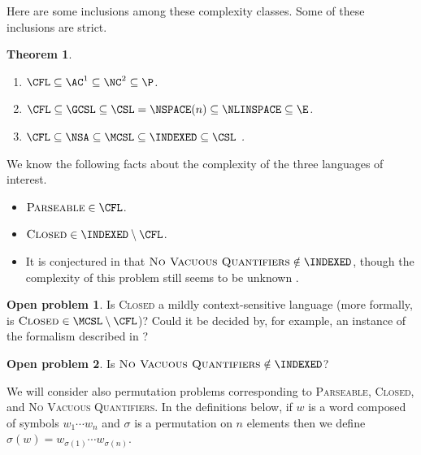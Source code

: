 \documentclass{article}
\newtheorem{theorem}{Theorem}
\theoremstyle{definition}
\newtheorem{openproblem}{Open problem}
\newcommand{\lb}{\left\{} %
\newcommand{\rb}{\right\}} %
\newcommand{\st}{\,\middle|\,} %
\newcommand{\CLOSED}{\textsc{Closed}}
\newcommand{\PARSEABLE}{\textsc{Parseable}}
\newcommand{\NVQ}{\textsc{No Vacuous Quantifiers}}
\begin{document}
Here are some inclusions among these complexity classes.
Some of these inclusions are strict.
\begin{theorem}\mbox{}
  \begin{enumerate}
  \item $\CFL\subseteq\AC^1\subseteq\NC^2\subseteq\P$.
  \item $\CFL\subseteq\GCSL\subseteq\CSL=\NSPACE(n)\subseteq\NLINSPACE\subseteq\E$.
  \item $\CFL\subseteq\NSA\subseteq\MCSL\subseteq\INDEXED\subseteq\CSL$ \cite{hu79}.
  \end{enumerate}
\end{theorem}

We know the following facts about the complexity of the three languages of interest.
\begin{itemize}
\item $\PARSEABLE \in \CFL$.
\item $\CLOSED \in \INDEXED \setminus \CFL$. \cite{mp84}
\item It is conjectured in \cite{mp84} that $\NVQ \notin \INDEXED$, though the complexity of this problem still seems to be unknown \cite{potts}.
\end{itemize}


\begin{openproblem}
  Is \CLOSED{} a mildly context-sensitive language (more formally, is $\CLOSED \in \MCSL \setminus \CFL$)? Could it be decided by, for example, an instance of the formalism described in \cite{kallmeyer}?
\end{openproblem}

\begin{openproblem}
  Is $\NVQ \notin \INDEXED$?
\end{openproblem}

We will consider also permutation problems corresponding to \PARSEABLE, \CLOSED, and \NVQ.
In the definitions below, if $w$ is a word composed of symbols $w_1 \dotsb w_n$ and $\sigma$ is a permutation on $n$ elements then we define $\sigma(w) = w_{\sigma(1)} \dotsb w_{\sigma(n)}$.
\end{document}
